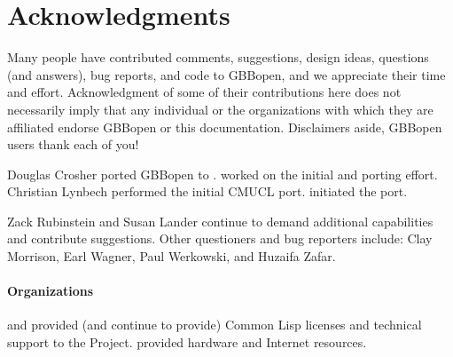 


\section*{Acknowledgments}
\T{}%
\label{sec:acknowledgments}%
%

Many people have contributed comments, suggestions, design ideas, questions
(and answers), bug reports, and code to GBBopen, and we appreciate their time
and effort.  Acknowledgment of some of their contributions here does not
necessarily imply that any individual or the organizations with which they are
affiliated endorse GBBopen or this documentation.  Disclaimers aside, GBBopen
users thank each of you!

Douglas Crosher ported GBBopen to .   worked on the initial  and
 porting effort.
Christian Lynbech performed the initial CMUCL port.   initiated the
 port.

Zack Rubinstein and Susan Lander continue to demand additional
capabilities and contribute suggestions.  Other questioners and bug
reporters include: Clay Morrison, Earl Wagner, Paul Werkowski, and
Huzaifa Zafar.

\paragraph{Organizations}

 and  provided (and continue to provide)
Common Lisp licenses and technical support to the Project.
 provided hardware
and Internet resources.  

